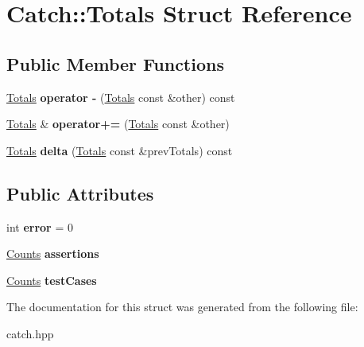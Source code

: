 \hypertarget{structCatch_1_1Totals}{}\section{Catch\+::Totals Struct Reference}
\label{structCatch_1_1Totals}
\subsection*{Public Member Functions}
\begin{DoxyCompactItemize}
\item 
\mbox{\label{structCatch_1_1Totals_a4e78ceccf9473cbb117e1803907e174d}} 
\mbox{\hyperlink{structCatch_1_1Totals}{Totals}} {\bfseries operator -\/} (\mbox{\hyperlink{structCatch_1_1Totals}{Totals}} const \&other) const
\item 
\mbox{\label{structCatch_1_1Totals_a574015076e54cc405c70b053e3356e43}} 
\mbox{\hyperlink{structCatch_1_1Totals}{Totals}} \& {\bfseries operator+=} (\mbox{\hyperlink{structCatch_1_1Totals}{Totals}} const \&other)
\item 
\mbox{\label{structCatch_1_1Totals_a1a94a654f5f3786b75695e081fc9bca2}} 
\mbox{\hyperlink{structCatch_1_1Totals}{Totals}} {\bfseries delta} (\mbox{\hyperlink{structCatch_1_1Totals}{Totals}} const \&prev\+Totals) const
\end{DoxyCompactItemize}
\subsection*{Public Attributes}
\begin{DoxyCompactItemize}
\item 
\mbox{\label{structCatch_1_1Totals_a6ea14c7de7ea735a14f172a26e08a239}} 
int {\bfseries error} = 0
\item 
\mbox{\label{structCatch_1_1Totals_a885ded66df752147b30c3d45aa602ec9}} 
\mbox{\hyperlink{structCatch_1_1Counts}{Counts}} {\bfseries assertions}
\item 
\mbox{\label{structCatch_1_1Totals_adb195fe477aedee2ecea88c888f16506}} 
\mbox{\hyperlink{structCatch_1_1Counts}{Counts}} {\bfseries test\+Cases}
\end{DoxyCompactItemize}


The documentation for this struct was generated from the following file\+:\begin{DoxyCompactItemize}
\item 
catch.\+hpp\end{DoxyCompactItemize}
